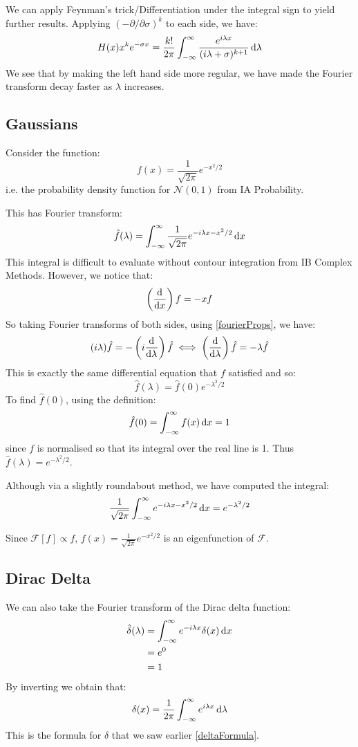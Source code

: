 \documentclass[../main.tex]{subfiles}
\begin{document}
We can apply Feynman's trick/Differentiation under the integral sign to yield further results.
Applying $(-\partial/\partial \sigma)^{k}$ to each side, we have:
\begin{equation}
  H(x) x^{k} e^{-\sigma x} = \frac{k!}{2\pi} \int_{-\infty}^{\infty} \frac{e^{i\lambda x}}{(i\lambda + \sigma)^{k + 1}} \d{\lambda} \label{expGen}
\end{equation}
We see that by making the left hand side more regular, we have made the Fourier transform decay faster as $\lambda$ increases.
\subsection{Gaussians} \label{gaussSec}
Consider the function:
\[
  f(x) = \frac{1}{\sqrt{2 \pi}} e^{-x^2/2}
\]
i.e. the probability density function for $\mathcal{N}(0, 1)$ from IA Probability.

This has Fourier transform:
\[
  \hat{f}(\lambda) = \int_{-\infty}^{\infty} \frac{1}{\sqrt{2\pi}} e^{-i\lambda x - x^2/2} \d{x}
\]
This integral is difficult to evaluate without contour integration from IB Complex Methods.
However, we notice that:
\[
  \left(\deriv{}{x}\right)f = -xf
\]
So taking Fourier transforms of both sides, using \cref{fourierProps}, we have:
\[
  (i\lambda)\hat{f} = -\left(i\deriv{}{\lambda}\right)\hat{f} \\
  \iff \left(\deriv{}{\lambda}\right) \hat{f} = -\lambda \hat{f}
\]
This is exactly the same differential equation that $f$ satisfied and so:
\[
  \hat{f}(\lambda) = \hat{f}(0) e^{-\lambda^2/2}
\]
To find $\hat{f}(0)$, using the definition:
\[
  \hat{f}(0) = \int_{-\infty}^{\infty} f(x) \d{x}  = 1
\]
since $f$ is normalised so that its integral over the real line is 1.
Thus $\hat{f}(\lambda) = e^{-\lambda^2/2}$.

Although via a slightly roundabout method, we have computed the integral:
\[
  \frac{1}{\sqrt{2\pi}} \int_{-\infty}^{\infty} e^{-i\lambda x - x^2/2} \d{x} = e^{-\lambda^2/2}
\]
\begin{remark}
  Since $\mathcal{F}[f] \propto f$, $f(x) = \frac{1}{\sqrt{2 \pi}} e^{-x^2/2}$ is an eigenfunction of $\mathcal{F}$.
\end{remark}
\subsection{Dirac Delta}
We can also take the Fourier transform of the Dirac delta function:
\begin{align*}
  \hat{\delta}(\lambda) &= \int_{-\infty}^{\infty} e^{-i\lambda x}\delta(x) \d{x} \\
                        &= e^{0} \\
                        &= 1
\end{align*}
By inverting we obtain that:
\[
  \delta(x) = \frac{1}{2\pi} \int_{-\infty}^{\infty} e^{i\lambda x} \d{\lambda}
\]
This is the formula for $\delta$ that we saw earlier \cref{deltaFormula}.
\end{document}
